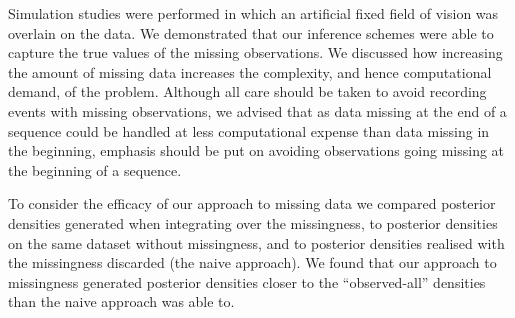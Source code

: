Simulation studies were performed in which an artificial fixed field of vision
was overlain on the data. We demonstrated that our inference schemes were able
to capture the true values of the missing observations. We discussed how
increasing the amount of missing data increases the complexity, and hence
computational demand, of the problem. Although all care should be taken to
avoid recording events with missing observations, we advised that as data
missing at the end of a sequence could be handled at less computational expense
than data missing in the beginning, emphasis should be put on avoiding
observations going missing at the beginning of a sequence.

To consider the efficacy of our approach to missing data we compared posterior
densities generated when integrating over the missingness, to posterior
densities on the same dataset without missingness, and to posterior densities
realised with the missingness discarded (the naive approach). We found
that our approach to missingness generated posterior densities closer to the
``observed-all'' densities than the naive approach was able to. 

